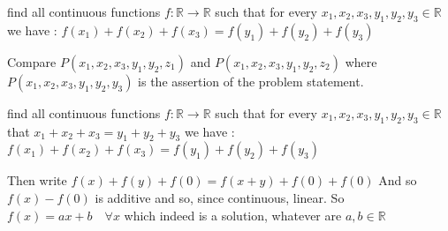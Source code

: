 \begin{solution}
	\begin{tcolorbox}find all continuous functions $f:\mathbb{R}\to\mathbb{R}$ such that for every $x_1,x_2,x_3,y_1,y_2,y_3\in\mathbb{R}$ we have :
$f(x_1)+f(x_2)+f(x_3)=f(y_1)+f(y_2)+f(y_3)$\end{tcolorbox}

Compare $P(x_1,x_2,x_3,y_1,y_2,z_1)$ and $P(x_1,x_2,x_3,y_1,y_2,z_2)$ where $P(x_1,x_2,x_3,y_1,y_2,y_3)$ is the assertion of the problem statement.
\end{solution}






\begin{solution}
	\begin{tcolorbox}find all continuous functions $f:\mathbb{R}\to\mathbb{R}$ such that for every $x_1,x_2,x_3,y_1,y_2,y_3\in\mathbb{R}$ that $x_1+x_2+x_3=y_1+y_2+y_3$ we have :
$f(x_1)+f(x_2)+f(x_3)=f(y_1)+f(y_2)+f(y_3)$\end{tcolorbox}
Then write $f(x)+f(y)+f(0)=f(x+y)+f(0)+f(0)$
And so $f(x)-f(0)$ is additive and so, since continuous, linear.
So $\boxed{f(x)=ax+b\quad\forall x}$ which indeed is a solution, whatever are $a,b\in\mathbb R$


\end{solution}



